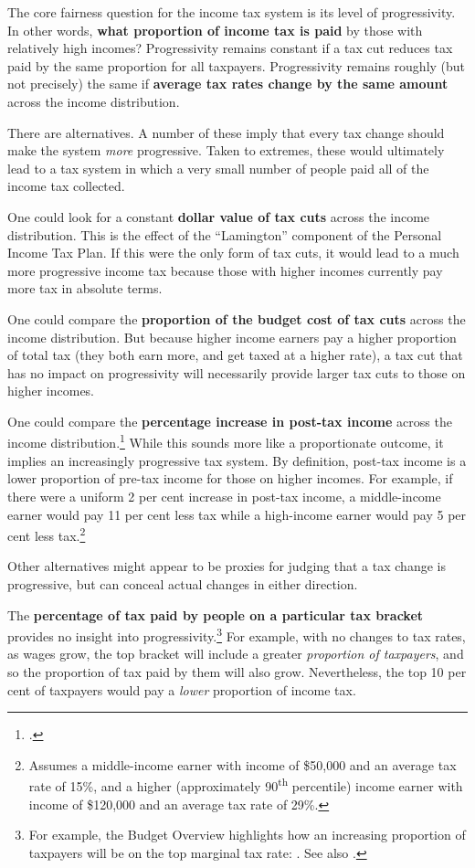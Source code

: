 \documentclass[submission]{grattan}\usepackage[]{graphicx}\usepackage[]{color}
\begin{document}
The core fairness question for the income tax system is its level of progressivity. In other words, \textbf{what proportion of income tax is paid} by those with relatively high incomes? Progressivity remains constant if a tax cut reduces tax paid by the same proportion for all taxpayers. Progressivity remains roughly (but not precisely) the same if \textbf{average tax rates change by the same amount} across the income distribution.

There are alternatives. A number of these imply that every tax change should make the system \emph{more} progressive. Taken to extremes, these would ultimately lead to a tax system in which a very small number of people paid all of the income tax collected.

One could look for a constant \textbf{dollar value of tax cuts} across the income distribution. This is the effect of the ``Lamington'' component of the Personal Income Tax Plan. If this were the only form of tax cuts, it would lead to a much more progressive income tax because those with higher incomes currently pay more tax in absolute terms.

One could compare the \textbf{proportion of the budget cost of tax cuts} across the income distribution.
But because higher income earners pay a higher proportion of total tax (they both earn more, and get taxed at a higher rate), a tax cut that has no impact on progressivity will necessarily provide larger tax cuts to those on higher incomes.

One could compare the \textbf{percentage increase in post-tax income} across the income distribution.\footcite[][11]{Phillips2018}
While this sounds more like a proportionate outcome, it implies an increasingly progressive tax system. By definition, post-tax income is a lower proportion of pre-tax income for those on higher incomes. For example, if there were a uniform 2 per cent increase in post-tax income, a middle-income earner would pay 11 per cent less tax while a high-income earner would pay 5 per cent less tax.\footnote{Assumes a middle-income earner with income of \$50,000 and an average tax rate of 15\%, and a higher (approximately 90\textsuperscript{th} percentile) income earner with income of \$120,000 and an average tax rate of 29\%.}

Other alternatives might appear to be proxies for judging that a tax change is progressive, but can conceal actual changes in either direction.

The \textbf{percentage of tax paid by people on a particular tax bracket} provides no insight into progressivity.\footnote{For example, the Budget Overview highlights how an increasing proportion of taxpayers will be on the top marginal tax rate: \textcite[][9]{Treasury2018b}. See also \textcite[][7--8]{Treasury2018c}.}
For example, with no changes to tax rates, as wages grow, the top bracket will include a greater \emph{proportion of taxpayers}, and so the proportion of tax paid by them will also grow. Nevertheless, the top 10 per cent of taxpayers would pay a \emph{lower} proportion of income tax.
\end{document}
